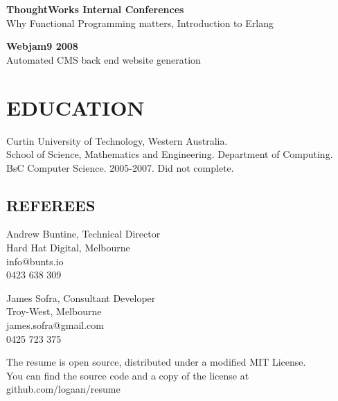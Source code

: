 \documentclass[margin]{res}
\begin{document}
\begin{resume}
\begin{multicols}{2}
    \textbf{ThoughtWorks Internal Conferences} \\
    Why Functional Programming matters, Introduction to Erlang

    \textbf{Webjam9 2008} \\
    Automated CMS back end website generation
  \end{multicols}

  \section{EDUCATION}
  Curtin University of Technology, Western Australia. \\
  School of Science, Mathematics and
  Engineering. Department of Computing. \\
  BsC Computer Science. 2005-2007. Did not complete.

  \begin{multicols}{2}
    \section{REFEREES}
    Andrew Buntine, Technical Director \\
    Hard Hat Digital, Melbourne \\
    info@bunts.io \\
    0423 638 309

    James Sofra, Consultant Developer \\
    Troy-West, Melbourne \\
    james.sofra@gmail.com \\
    0425 723 375
  \end{multicols}

\end{resume} 

\centering
\hspace{-1.75in} The resume is open source, distributed under a modified MIT
License. \\
\hspace{-1.75in} You can find the source code and a copy of the license at
github.com/logaan/resume
\end{document}
